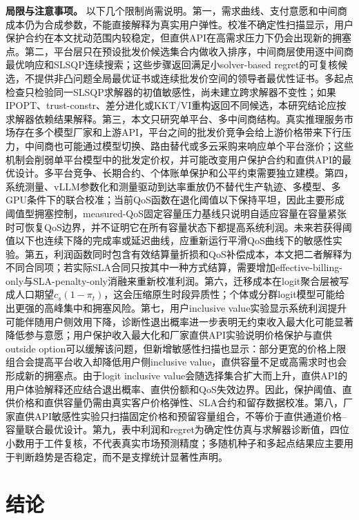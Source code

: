 \documentclass[UTF8,11pt]{ctexart}
\begin{document}
\textbf{局限与注意事项。} 以下几个限制尚需说明。第一，需求曲线、支付意愿和中间商成本仍为合成参数，不能直接解释为真实用户弹性。校准不确定性扫描显示，用户保护合约在本文扰动范围内较稳定，但直供API在高需求压力下仍会出现新的拥塞点。第二，平台层只在预设批发价候选集合内做收入排序，中间商层使用逐中间商最优响应和SLSQP连续搜索；这些步骤返回满足小solver-based regret的可复核候选，不提供非凸问题全局最优证书或连续批发价空间的领导者最优性证书。多起点检查只检验同一SLSQP求解器的初值敏感性，尚未建立跨求解器不变性；如果IPOPT、trust-constr、差分进化或KKT/VI重构返回不同候选，本研究结论应按求解器依赖结果解释。第三，本文只研究单平台、多中间商结构。真实推理服务市场存在多个模型厂家和上游API，平台之间的批发价竞争会给上游价格带来下行压力，中间商也可能通过模型切换、路由替代或多云采购来响应单个平台涨价；这些机制会削弱单平台模型中的批发定价权，并可能改变用户保护合约和直供API的最优设计。多平台竞争、长期合约、个体账单保护和公平约束需要独立建模。第四，系统测量、vLLM参数化和测量驱动到达率重放仍不替代生产轨迹、多模型、多GPU条件下的联合校准；当前QoS函数在退化阈值以下保持平坦，因此主要形成阈值型拥塞控制，measured-QoS固定容量压力基线只说明自适应容量在容量紧张时可恢复QoS边界，并不证明它在所有容量状态下都提高系统利润。未来若获得阈值以下也连续下降的完成率或延迟曲线，应重新运行平滑QoS曲线下的敏感性实验。第五，利润函数同时包含有效结算量折损和QoS补偿成本，本文把二者解释为不同合同项；若实际SLA合同只按其中一种方式结算，需要增加effective-billing-only与SLA-penalty-only消融来重新校准利润。第六，迁移成本在logit聚合层被写成人口期望$c_s(1-\pi_t)$，这会压缩原生时段异质性；个体或分群logit模型可能给出更强的高峰集中和拥塞风险。第七，用户inclusive value实验显示系统利润提升可能伴随用户侧效用下降，诊断性退出概率进一步表明无约束收入最大化可能显著降低参与意愿；用户保护收入最大化和厂家直供API实验说明价格保护与直供outside option可以缓解该问题，但新增敏感性扫描也显示：部分更宽的价格上限组合会提高平台收入却降低用户侧inclusive value，直供容量不足或高需求时也会形成新的拥塞点。由于logit inclusive value会随选择集合扩大而上升，直供API的用户体验解释还应结合退出概率、直供份额和QoS失效边界。因此，保护阈值、直供价格和直供容量仍需由真实客户价格弹性、SLA合约和留存数据校准。第八，厂家直供API敏感性实验只扫描固定价格和预留容量组合，不等价于直供通道价格--容量联合最优设计。第九，表中利润和regret为确定性仿真与求解器诊断值，四位小数用于工件复核，不代表真实市场预测精度；多随机种子和多起点结果应主要用于判断趋势是否稳定，而不是支撑统计显著性声明。

\section{结论}
\label{sec:conclusion}
\end{document}

